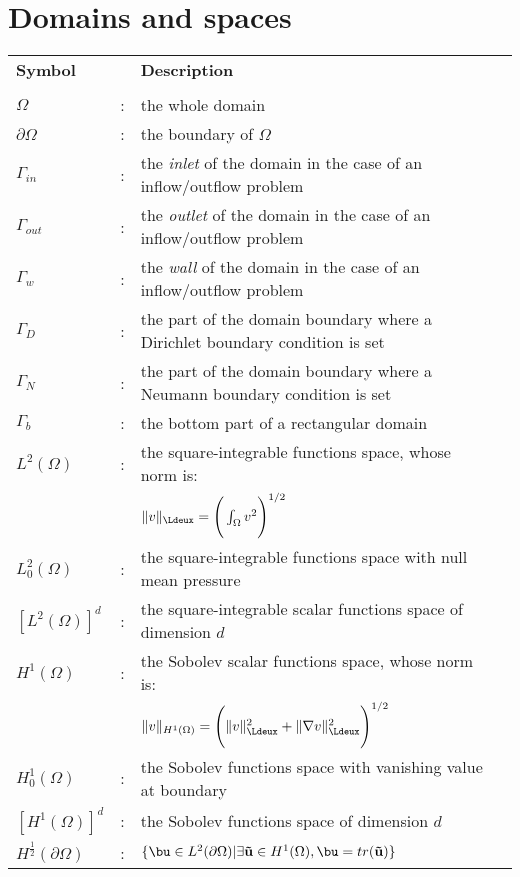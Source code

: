 \section*{Domains and spaces}
\vspace{-6mm}
\begin{longtable}{lcp{}l}
  \textbf{Symbol} & & \textbf{Description} \\
   & & & \\
  $\Omega$ &: & the whole domain &\\
  $\partial \Omega $ & : & the boundary of $\Omega $ & \\
  $\Gamma_{in}$ &:& the \textit{inlet} of the domain in the case of an inflow/outflow problem & \\
  $\Gamma_{out}$ &:& the \textit{outlet} of the domain in the case of an inflow/outflow problem & \\
  $\Gamma_{w}$ &:& the \textit{wall} of the domain in the case of an inflow/outflow problem & \\
  $\Gamma_{D}$ &:& the part of the domain boundary where a Dirichlet boundary condition is set  & \\
  $\Gamma_{N}$ &:& the part of the domain boundary where a Neumann boundary condition is set  & \\
  $\Gamma_{b}$ &:& the bottom part of a rectangular domain & \\
  $L^2(\Omega)$ & : & the square-integrable functions space, whose norm is: &   \\
  && $ \| v \|_{\Ldeux}  = \Bigg( \int_{\Omega} v^2 \Bigg)^{1/2}$ & \\
   $L^2_0(\Omega)$ & : & the square-integrable functions space with null mean pressure &   \\
  $[L^2(\Omega)]^d$ & : & the square-integrable scalar functions space of dimension $d$ &   \\
  $H^1(\Omega)$ & : & the Sobolev scalar functions space, whose norm is: &  \\
   &&$ \| v \|_{H^1(\Omega)}  =\Bigg( \| v \|^2_{\Ldeux} + \| \nabla v \|^2_{\Ldeux}\Bigg)^{1/2}$ & \\
   $H^1_0(\Omega)$ & : & the Sobolev functions space with vanishing value at boundary &  \\
  $[H^1(\Omega)]^d$ & : & the Sobolev functions space of dimension $d$ &  \\
  $H^{\frac{1}{2}}(\partial\Omega)$ & : &$ \{ \bu \in L^2(\partial\Omega) | \exists \mathbf{\tilde{u}} \in H^1(\Omega), \bu=tr( \mathbf{\tilde{u}}) \}$ &  \\

\end{longtable}
